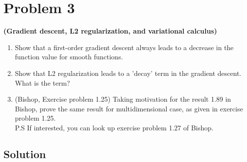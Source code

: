 \section*{Problem 3}

\textbf{(Gradient descent, L2 regularization, and variational calculus)}\\
\begin{enumerate}[label= (\alph*), noitemsep, topsep=0pt]
    \item Show that a first-order gradient descent always leads to a decrease in the function value for smooth functions.

    \item Show that L2 regularization leads to a 'decay' term in the gradient descent. What is the term?

    \item (Bishop, Exercise problem 1.25) Taking motivation for the result 1.89 in Bishop, prove the same result for multidimensional case, as given in exercise problem 1.25.\\
          P.S If interested, you can look up exercise problem 1.27 of Bishop.
\end{enumerate}

\subsection*{Solution}

